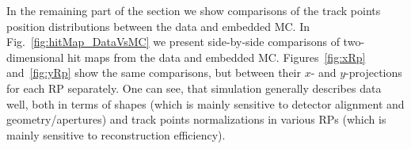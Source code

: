 In the remaining part of the section we show comparisons of the track points position distributions between the data and embedded MC. In Fig.~\ref{fig:hitMap_DataVsMC} we present side-by-side comparisons of two-dimensional hit maps from the data and embedded MC. Figures~\ref{fig:xRp} and~\ref{fig:yRp} show the same comparisons, but between their $x$- and $y$-projections for each RP separately. One can see, that simulation generally describes data well, both in terms of shapes (which is mainly sensitive to detector alignment and geometry/apertures) and track points normalizations in various RPs (which is mainly sensitive to reconstruction efficiency).


\begin{figure}[h]
\centering
\parbox{0.4725\textwidth}{
  \centering
  \begin{subfigure}[b]{\linewidth}
  \end{subfigure}\\[10pt]
  \begin{subfigure}[b]{\linewidth}\addtocounter{subfigure}{1}

\end{subfigure}}
\end{figure}
